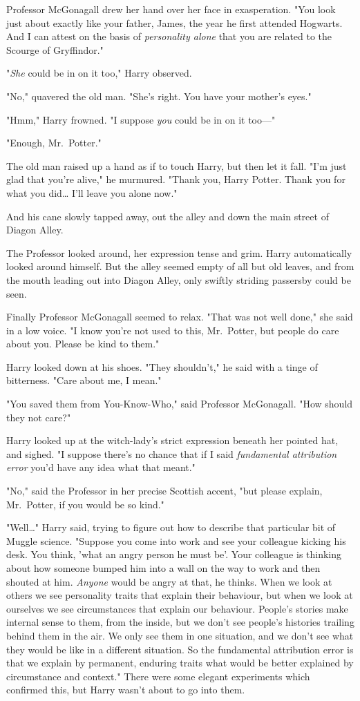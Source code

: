 Professor McGonagall drew her hand over her face in exasperation. "You look 
just about exactly like your father, James, the year he first attended 
Hogwarts. And I can attest on the basis of \emph{personality alone} that you 
are related to the Scourge of Gryffindor."

"\emph{She} could be in on it too," Harry observed.

"No," quavered the old man. "She's right. You have your mother's eyes."

"Hmm," Harry frowned. "I suppose \emph{you} could be in on it too---"

"Enough, Mr.~Potter."

The old man raised up a hand as if to touch Harry, but then let it fall. "I'm 
just glad that you're alive," he murmured. "Thank you, Harry Potter. Thank you 
for what you did{\ldots} I'll leave you alone now."

And his cane slowly tapped away, out the alley and down the main street of 
Diagon Alley.

The Professor looked around, her expression tense and grim. Harry automatically 
looked around himself. But the alley seemed empty of all but old leaves, and 
from the mouth leading out into Diagon Alley, only swiftly striding passersby 
could be seen.

Finally Professor McGonagall seemed to relax. "That was not well done," she 
said in a low voice. "I know you're not used to this, Mr.~Potter, but people do 
care about you. Please be kind to them."

Harry looked down at his shoes. "They shouldn't," he said with a tinge of 
bitterness. "Care about me, I mean."

"You saved them from You-Know-Who," said Professor McGonagall. "How should they 
not care?"

Harry looked up at the witch-lady's strict expression beneath her pointed hat, 
and sighed. "I suppose there's no chance that if I said \emph{fundamental 
attribution error} you'd have any idea what that meant."

"No," said the Professor in her precise Scottish accent, "but please explain, 
Mr.~Potter, if you would be so kind."

"Well{\ldots}" Harry said, trying to figure out how to describe that particular 
bit of Muggle science. "Suppose you come into work and see your colleague 
kicking his desk. You think, 'what an angry person he must be'. Your colleague 
is thinking about how someone bumped him into a wall on the way to work and 
then shouted at him. \emph{Anyone} would be angry at that, he thinks. When we 
look at others we see personality traits that explain their behaviour, but when 
we look at ourselves we see circumstances that explain our behaviour. People's 
stories make internal sense to them, from the inside, but we don't see people's 
histories trailing behind them in the air. We only see them in one situation, 
and we don't see what they would be like in a different situation. So the 
fundamental attribution error is that we explain by permanent, enduring traits 
what would be better explained by circumstance and context." There were some 
elegant experiments which confirmed this, but Harry wasn't about to go into 
them.

